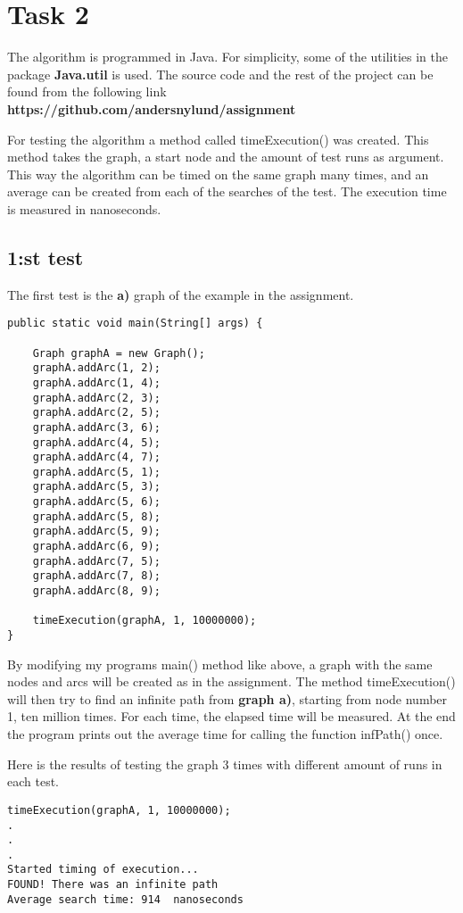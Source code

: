 \documentclass[]{article}
\begin{document}
\newpage
\section*{Task 2}

The algorithm is programmed in Java. For simplicity, some of the utilities in the package \textbf{Java.util} is used. The source code and the rest of the project can be found from the following link \textbf{https://github.com/andersnylund/assignment}

For testing the algorithm a method called timeExecution() was created. This method takes the graph, a start node and the amount of test runs as argument. This way the  algorithm can be timed on the same graph many times, and an average can be created from each of the searches of the test. The execution time is measured in nanoseconds.

\subsection*{1:st test}

The first test is the \textbf{a)} graph of the example in the assignment. 

\begin{lstlisting}
public static void main(String[] args) {

	Graph graphA = new Graph();
	graphA.addArc(1, 2);
	graphA.addArc(1, 4);
	graphA.addArc(2, 3);
	graphA.addArc(2, 5);
	graphA.addArc(3, 6);
	graphA.addArc(4, 5);
	graphA.addArc(4, 7);
	graphA.addArc(5, 1);
	graphA.addArc(5, 3);
	graphA.addArc(5, 6);
	graphA.addArc(5, 8);
	graphA.addArc(5, 9);
	graphA.addArc(6, 9);
	graphA.addArc(7, 5);
	graphA.addArc(7, 8);
	graphA.addArc(8, 9);

	timeExecution(graphA, 1, 10000000);
}
\end{lstlisting}
By modifying my programs main() method like above, a graph with the same nodes and arcs will be created as in the assignment. The method timeExecution() will then try to find an infinite path from \textbf{graph a)}, starting from node number 1, ten million times. For each time, the elapsed time will be measured. At the end the program prints out the average time for calling the function infPath() once. \newpage

Here is the results of testing the graph 3 times with different amount of runs in each test.


\begin{lstlisting}
timeExecution(graphA, 1, 10000000);
.
.
.
Started timing of execution...
FOUND! There was an infinite path
Average search time: 914  nanoseconds
\end{lstlisting}
\end{document}
